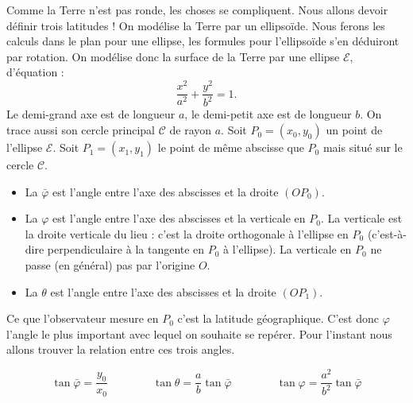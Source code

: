 \documentclass[class=report,crop=false]{standalone}
\begin{document}
Comme la Terre n'est pas ronde, les choses se compliquent.
Nous allons devoir définir trois latitudes ! On modélise la Terre 
par un ellipsoïde. Nous ferons les calculs dans le plan pour une ellipse, 
les formules pour l'ellipsoïde s'en déduiront par rotation.
On modélise donc la surface de la Terre par une ellipse $\mathcal{E}$, d'équation :
$$\frac{x^2}{a^2}+\frac{y^2}{b^2}=1.$$
Le demi-grand axe est de longueur $a$, le demi-petit axe est de longueur $b$.
On trace aussi son cercle principal $\mathcal{C}$ de rayon $a$.
Soit $P_0=(x_0,y_0)$ un point de l'ellipse $\mathcal{E}$. 
Soit $P_1=(x_1,y_1)$ le point de même abscisse que $P_0$ 
mais situé sur le cercle $\mathcal{C}$.


\begin{itemize}
  \item La  $\bar \varphi$ est l'angle entre l'axe des abscisses
  et la droite $(OP_0)$.
  
  \item La  $\varphi$ est l'angle entre 
  l'axe des abscisses et la verticale en $P_0$. La verticale est la droite verticale du lieu :
  c'est la droite orthogonale à l'ellipse en $P_0$ (c'est-à-dire perpendiculaire à la tangente en $P_0$ à l'ellipse).   La verticale en $P_0$ ne passe (en général) pas par l'origine $O$.
  
  \item La  $\theta$ est l'angle entre l'axe des abscisses
  et la droite $(OP_1)$.
\end{itemize}


Ce que l'observateur mesure en $P_0$ c'est la latitude géographique. 
C'est donc $\varphi$ l'angle le plus important avec lequel on souhaite se repérer.
Pour l'instant nous allons trouver la relation entre ces trois angles.

\begin{proposition}
\label{prop :gpstangente}
$$
\tan \bar\varphi = \frac{y_0}{x_0} \qquad\qquad 
\tan \theta = \frac{a}{b} \tan \bar\varphi \qquad\qquad  
\tan \varphi = \frac{a^2}{b^2} \tan \bar\varphi
$$  
\end{proposition}
\end{document}
